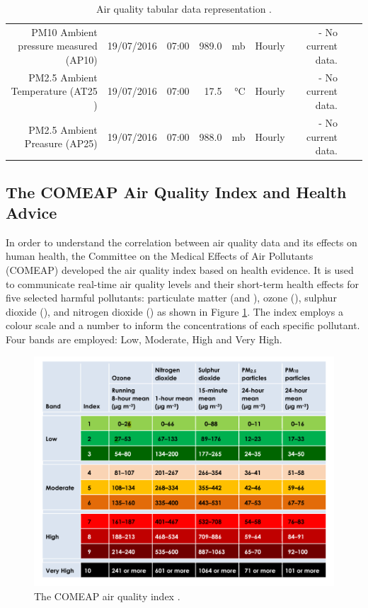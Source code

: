 \begin{table}[ht]
\begin{adjustbox}{width=1.2\textwidth,center=\textwidth}
\begin{tabular}{rlrrrrrrr}
	PM10 Ambient pressure measured (AP10) & 19/07/2016 & 07:00 & 989.0 & mb & Hourly & - No current data. \\
	PM2.5 Ambient Temperature (AT25 ) & 19/07/2016 & 07:00 & 17.5 & °C & Hourly & - No current data. \\
	PM2.5 Ambient Preasure (AP25) & 19/07/2016 & 07:00 & 988.0 & mb & Hourly & - No current data. \\
   \hline
\end{tabular}
\end{adjustbox}
\caption{Air quality tabular data representation \cite{DepartmentforEnvironment}.}
\label{tab:pollution_tabular_data}
\end{table} 

\subsection{The COMEAP Air Quality Index and Health Advice}
In order to understand the correlation between air quality data and its effects on human health, the Committee on the Medical Effects of Air Pollutants (COMEAP) developed the air quality index based on health evidence. It is used to communicate real-time air quality levels and their short-term health effects for five selected harmful pollutants: particulate matter (\PMTEN and \PMTWO), ozone (\OTHREE), sulphur dioxide (\SOTWO), and nitrogen dioxide (\NOTWO) as shown in Figure \ref{fig:air_quality_index}. The index employs a colour scale and a number  to inform the concentrations of each specific pollutant. Four bands are employed: Low, Moderate, High and Very High. 

\begin{figure}[H]
\begin{adjustbox}{width=1\textwidth,center=\textwidth}
  \centering
  \includegraphics[scale=.8]{images/air_quality_index.png}
\end{adjustbox}
  \caption[The COMEAP air quality index]{The COMEAP air quality index \cite{HealthProtectionAgencyfortheCommitteeontheMedicalEffectsofAirPollutants2011}.}
  \label{fig:air_quality_index}
\end{figure}

